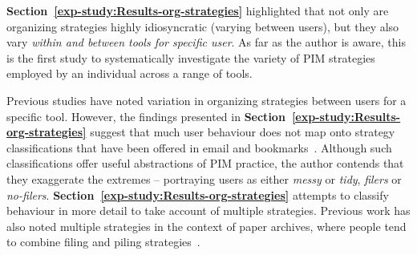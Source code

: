 
\textbf{Section~\ref{exp-study:Results-org-strategies}} highlighted that not only are organizing strategies highly idiosyncratic (varying between users), but they also vary \textit{within and between tools for specific user}. As far as the author is aware, this is the first study to systematically investigate the variety of PIM strategies employed by an individual across a range of tools.  


Previous studies have noted variation in organizing strategies between users for a specific tool.  However, the findings presented in \textbf{Section~\ref{exp-study:Results-org-strategies}} suggest that much user behaviour does not map onto strategy classifications that have been offered in email and bookmarks~\citep{da:98,ob:97,Whittaker-email:96}. Although such classifications offer useful abstractions of PIM practice, the author contends that they exaggerate the extremes -- portraying users as either \textit{messy} or \textit{tidy}, \textit{filers} or \textit{no-filers}. \textbf{Section~\ref{exp-study:Results-org-strategies}} attempts to classify behaviour in more detail to take account of multiple strategies.  Previous work has also noted multiple strategies in the context of paper archives, where people tend to combine filing and piling strategies~\citep{Whittaker-paper:01}. 

